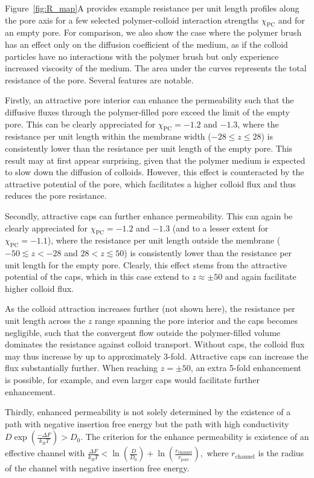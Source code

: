 \documentclass[12pt, a4paper]{article}
\begin{document}
Figure~\ref{fig:R_map}A provides example resistance per unit length profiles along the pore axis for a few selected polymer-colloid interaction strengths $\chi_{\textrm{PC}}$ and for an empty pore. 
For comparison, we also show the case where the polymer brush has an effect only on the diffusion coefficient of the medium, as if the colloid particles have no interactions with the polymer brush but only experience increased viscosity of the medium.
The area under the curves represents the total resistance of the pore.
Several features are notable. 

Firstly, an attractive pore interior can enhance the permeability such that the diffusive fluxes through the polymer-filled pore exceed the limit of the empty pore.
This can be clearly appreciated for $\chi_{\textrm{PC}} = -1.2$ and $-1.3$, where the resistance per unit length within the membrane width ($-28 \leq z \leq 28$) is consistently lower than the resistance per unit length of the empty pore.
This result may at first appear surprising, given that the polymer medium is expected to slow down the diffusion of colloids.
However, this effect is counteracted by the attractive potential of the pore, which facilitates a higher colloid flux and thus reduces the pore resistance.

Secondly, attractive caps can further enhance permeability.
This can again be clearly appreciated for $\chi_{\textrm{PC}} = -1.2$ and $-1.3$ (and to a lesser extent for $\chi_{\textrm{PC}} = -1.1$), where the resistance per unit length outside the membrane ($-50 \lesssim z < -28$ and $28 < z \lesssim 50$) is consistently lower than the resistance per unit length for the empty pore. 
Clearly, this effect stems from the attractive potential of the caps, which in this case extend to $z \approx \pm 50$ and again facilitate higher colloid flux. 

As the colloid attraction increases further (not shown here), the resistance per unit length across the $z$ range spanning the pore interior and the caps becomes negligible, such that the convergent flow outside the polymer-filled volume dominates the resistance against colloid transport.
Without caps, the colloid flux may thus increase by up to approximately 3-fold. 
Attractive caps can increase the flux substantially further.
When reaching $z = \pm 50$, an extra 5-fold enhancement is possible, for example, and even larger caps would facilitate further enhancement.

Thirdly, enhanced permeability is not solely determined by the existence of a path with negative insertion free energy but the path with high conductivity $D\exp(\frac{-\Delta F}{k_B T})>D_0$. 
The criterion for the enhance permeability is existence of an effective channel with
$
\frac{\Delta F}{k_B T} < \ln\left( \frac{D}{D_0} \right) + \ln\left( \frac{r_{\textrm{channel}}}{r_{\textrm{pore}}} \right),
$
where $r_{\textrm{channel}}$ is the radius of the channel with negative insertion free energy.
\end{document}
